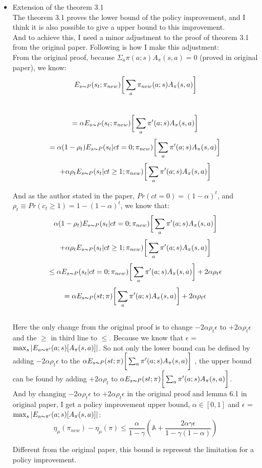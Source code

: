 \begin{itemize}
\item Extension of the theorem 3.1\\
The theorem 3.1 proves the lower bound of the policy improvement, and I think it is also possible to give a upper bound to this improvement. \\
And to achieve this, I need a minor adjustment to the proof of theorem 3.1 from the original paper. Following is how I make this adjustment: \\
From the original proof, because $\Sigma_{a}\pi(a;s)A_{\pi}(s,a) = 0$ (proved in original paper), we know: \\
\[ E_{s {\thicksim} P}(s_{t};\pi_{new}) \bigg[\sum_{a} \pi_{new}(a;s) A_{\pi} (s,a) \bigg]\] \\
\[ = \alpha E_{s {\thicksim} P}(s_{t};\pi_{new}) \bigg[\sum_{a} \pi'(a;s) A_{\pi} (s,a) \bigg] \]
\[ = \alpha (1 - \rho_{t}) E_{s {\thicksim} P}(s_{t}|ct=0;\pi_{new}) \bigg[\sum_{a} \pi'(a;s) A_{\pi} (s,a) \bigg] \] 
\[+ \alpha \rho_{t} E_{s {\thicksim} P}(s_{t}|ct \geq 1;\pi_{new}) \bigg[\sum_{a} \pi'(a;s) A_{\pi} (s,a) \bigg]\]

And as the author stated in the paper, $Pr(ct = 0) = (1 - \alpha)^{t}$, and
$\rho_{t} \equiv Pr(c_{t} \geq 1) = 1 - (1 - \alpha)^{t}$, we know that:
\[ \alpha (1 - \rho_{t}) E_{s {\thicksim} P}(s_{t}|ct=0;\pi_{new}) \bigg[\sum_{a} \pi'(a;s) A_{\pi} (s,a) \bigg] \]
\[+ \alpha \rho_{t} E_{s {\thicksim} P}(s_{t}|ct \geq 1;\pi_{new}) \bigg[\sum_{a} \pi'(a;s) A_{\pi} (s,a) \bigg] \] 
\[\leq \alpha E_{s {\thicksim} P}(s_{t}|ct=0;\pi_{new}) \bigg[\sum_{a} \pi'(a;s) A_{\pi} (s,a) \bigg] + 2 \alpha \rho_{t} \epsilon \]
\[ = \alpha E_{s {\thicksim} P}(st;\pi)\bigg[\sum_{a} \pi'(a;s) A_{\pi} (s,a) \bigg] + 2 \alpha \rho_{t} \epsilon\] \\

Here the only change from the original proof is to change $- 2 \alpha \rho_{t} \epsilon$ to $+ 2 \alpha \rho_{t} \epsilon$ and the $\geq$ in third line to
$\leq$. Because we know that $\epsilon$ = $\max_{s}|E_{a{\thicksim}\pi'}(a;s)[A_{\pi}(s,a)]|$. So not only the lower bound
can be defined by adding $- 2 \alpha \rho_{t} \epsilon$ to the $\alpha E_{s {\thicksim} P}(st;\pi)\bigg[\sum_{a} \pi'(a;s) A_{\pi} (s,a) \bigg]$ , the upper bound can be found by adding $+ 2 \alpha \rho_{t}$
to $\alpha E_{s {\thicksim} P}(st;\pi)\bigg[\sum_{a} \pi'(a;s) A_{\pi} (s,a) \bigg]$.\\
And by changing $- 2 \alpha \rho_{t} \epsilon$ to $+ 2 \alpha \rho_{t} \epsilon$ in the original proof and lemma 6.1 in original paper, I get a policy improvement upper
bound, $\alpha \in [0, 1]$ and $\epsilon$ = $\max_{s}|E_{a{\thicksim}\pi'}(a;s)[A_{\pi}(s,a)]|$:
\[ \eta_{\mu}(\pi_{new}) - \eta_{\mu}(\pi) \leq \frac{\alpha}{1-\gamma} (\mathbb{A} + \frac{2\alpha\gamma\epsilon}{1 - \gamma(1 - \alpha)}) \]

Different from the original paper, this bound is represent the limitation for
a policy improvement.


\end{itemize}

 







